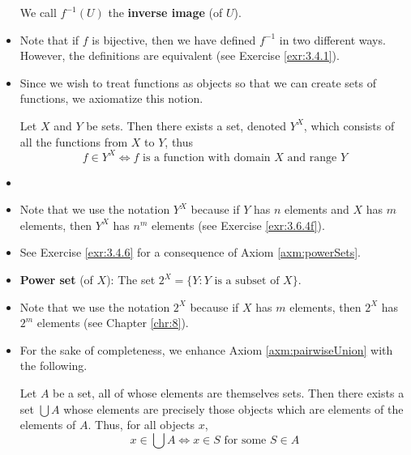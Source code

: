 \documentclass[../main.tex]{subfiles}
\begin{document}
\begin{itemize}
\begin{dfn}
        We call $f^{-1}(U)$ the \textbf{inverse image} (of $U$).
    \end{dfn}
    \item Note that if $f$ is bijective, then we have defined $f^{-1}$ in two different ways. However, the definitions are equivalent (see Exercise \ref{exr:3.4.1}).
    \item Since we wish to treat functions as objects so that we can create sets of functions, we axiomatize this notion.
    \begin{axm}\label{axm:powerSets}
        Let $X$ and $Y$ be sets. Then there exists a set, denoted $Y^X$, which consists of all the functions from $X$ to $Y$, thus
        \begin{equation*}
            f\in Y^X \Longleftrightarrow f\text{ is a function with domain }X\text{ and range }Y
        \end{equation*}
    \end{axm}
    \item {}
    \item Note that we use the notation $Y^X$ because if $Y$ has $n$ elements and $X$ has $m$ elements, then $Y^X$ has $n^m$ elements (see Exercise \ref{exr:3.6.4f}).
    \item See Exercise \ref{exr:3.4.6} for a consequence of Axiom \ref{axm:powerSets}.
    \item \textbf{Power set} (of $X$): The set $2^X=\{Y:Y\text{ is a subset of }X\}$.
    \item Note that we use the notation $2^X$ because if $X$ has $m$ elements, then $2^X$ has $2^m$ elements (see Chapter \ref{chr:8}).
    \item For the sake of completeness, we enhance Axiom \ref{axm:pairwiseUnion} with the following.
    \begin{axm}[Union]\label{axm:union}
        Let $A$ be a set, all of whose elements are themselves sets. Then there exists a set $\bigcup A$ whose elements are precisely those objects which are elements of the elements of $A$. Thus, for all objects $x$,
        \begin{equation*}
            x\in\bigcup A \Longleftrightarrow x\in S\text{ for some }S\in A
        \end{equation*}

\end{axm}
\end{itemize}
\end{document}
